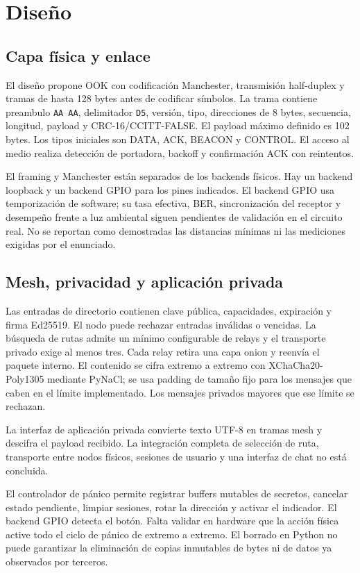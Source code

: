 \documentclass[12pt,a4paper]{article}
\begin{document}
\section{Diseño}

\subsection{Capa física y enlace}
El diseño propone OOK con codificación Manchester, transmisión half-duplex y
tramas de hasta 128 bytes antes de codificar símbolos. La trama contiene
preambulo \texttt{AA AA}, delimitador \texttt{D5}, versión, tipo, direcciones
de 8 bytes, secuencia, longitud, payload y CRC-16/CCITT-FALSE. El payload
máximo definido es 102 bytes. Los tipos iniciales son DATA, ACK, BEACON y
CONTROL. El acceso al medio realiza detección de portadora, backoff y
confirmación ACK con reintentos.

El framing y Manchester están separados de los backends físicos. Hay un
backend loopback y un backend GPIO para los pines indicados. El backend GPIO
usa temporización de software; su tasa efectiva, BER, sincronización del
receptor y desempeño frente a luz ambiental siguen pendientes de validación
en el circuito real. No se reportan como demostradas las distancias mínimas ni
las mediciones exigidas por el enunciado.

\subsection{Mesh, privacidad y aplicación privada}
Las entradas de directorio contienen clave pública, capacidades, expiración y
firma Ed25519. El nodo puede rechazar entradas inválidas o vencidas. La
búsqueda de rutas admite un mínimo configurable de relays y el transporte
privado exige al menos tres. Cada relay retira una capa onion y reenvía el
paquete interno. El contenido se cifra extremo a extremo con
XChaCha20-Poly1305 mediante PyNaCl; se usa padding de tamaño fijo para los
mensajes que caben en el límite implementado. Los mensajes privados mayores
que ese límite se rechazan.

La interfaz de aplicación privada convierte texto UTF-8 en tramas mesh y
descifra el payload recibido. La integración completa de selección de ruta,
transporte entre nodos físicos, sesiones de usuario y una interfaz de chat no
está concluida.

El controlador de pánico permite registrar buffers mutables de secretos,
cancelar estado pendiente, limpiar sesiones, rotar la dirección y activar el
indicador. El backend GPIO detecta el botón. Falta validar en hardware que la
acción física active todo el ciclo de pánico de extremo a extremo. El borrado
en Python no puede garantizar la eliminación de copias inmutables de bytes ni
de datos ya observados por terceros.
\end{document}
